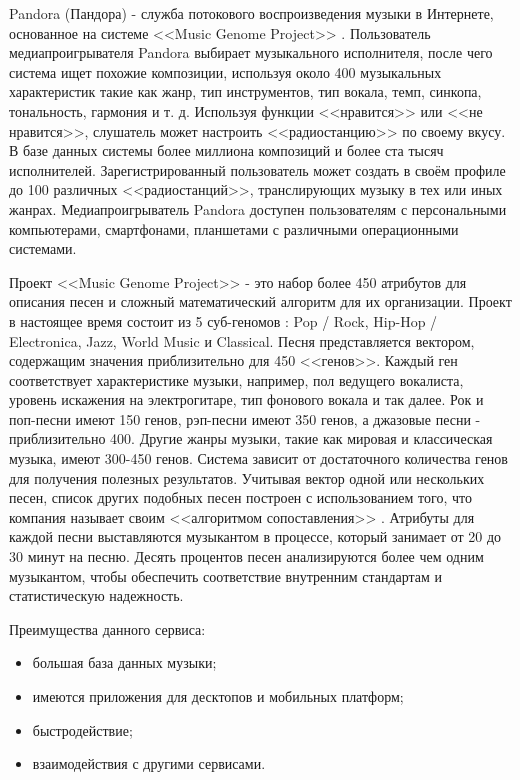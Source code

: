 Pandora (Пандора) - служба потокового воспроизведения музыки в Интернете, основанное на  системе <<Music Genome Project>> \cite{pandora_blog}. Пользователь медиапроигрывателя Pandora выбирает музыкального исполнителя, после чего система ищет похожие композиции, используя около 400 музыкальных характеристик такие как жанр, тип инструментов, тип вокала, темп, синкопа, тональность, гармония и т. д. Используя функции <<нравится>> или <<не нравится>>, слушатель может настроить <<радиостанцию>> по своему вкусу. В базе данных системы более миллиона композиций и более ста тысяч исполнителей\cite{tech_blog}. Зарегистрированный пользователь может создать в своём профиле до 100 различных <<радиостанций>>, транслирующих музыку в тех или иных жанрах. Медиапроигрыватель Pandora доступен пользователям с персональными компьютерами, смартфонами, планшетами с различными операционными системами.

Проект <<Music Genome Project>> - это набор более 450 атрибутов для описания песен и сложный математический алгоритм для их организации. Проект в настоящее время состоит из 5 суб-геномов : Pop / Rock, Hip-Hop / Electronica, Jazz, World Music и Classical. Песня представляется вектором, содержащим значения приблизительно для 450 <<генов>>. Каждый ген соответствует характеристике музыки, например, пол ведущего вокалиста, уровень искажения на электрогитаре, тип фонового вокала и так далее. Рок и поп-песни имеют 150 генов, рэп-песни имеют 350 генов, а джазовые песни - приблизительно 400. Другие жанры музыки, такие как мировая и классическая музыка, имеют 300-450 генов. Система зависит от достаточного количества генов для получения полезных результатов. Учитывая вектор одной или нескольких песен, список других подобных песен построен с использованием того, что компания называет своим <<алгоритмом сопоставления>> \cite{google_patent}. Атрибуты для каждой песни выставляются музыкантом в процессе, который занимает от 20 до 30 минут на песню\cite{interview}. Десять процентов песен анализируются более чем одним музыкантом, чтобы обеспечить соответствие внутренним стандартам и статистическую надежность.

Преимущества данного сервиса:
\begin{itemize}
\item большая база данных музыки;
\item имеются приложения для десктопов и мобильных платформ;
\item быстродействие;
\item взаимодействия с другими сервисами.
\end{itemize}

